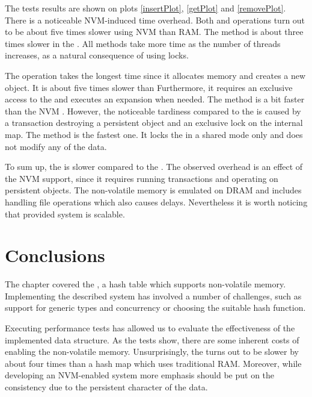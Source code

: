         The tests results are shown on plots \ref{insertPlot}, \ref{getPlot} and \ref{removePlot}. 
        There is a noticeable NVM-induced time overhead. 
        Both \insertMethod and \removeMethod operations turn out to be about five times slower using NVM than RAM. 
        The \getMethod method is about three times slower in the \NvmHashMap.
        All methods take more time as the number of threads increases, as a natural consequence of using locks.
        
        
        The \insertMethod operation takes the longest time since it allocates memory and creates a new object.
        It is about five times slower than
        Furthermore, it requires an exclusive access to the \internalHashMap and executes an expansion when needed. 
        The \removeMethod method is a bit faster than the NVM \insertMethod. 
        However, the noticeable tardiness compared to the \unorderedMap is caused by a transaction destroying a persistent object and an exclusive lock on the internal map.
        The \getMethod method is the fastest one. 
        It locks the \internalHashMap in a shared mode only and does not modify any of the data. 
        
        To sum up, the \NvmHashMap is slower compared to the \unorderedMap. 
        The observed overhead is an effect of the NVM support, since it requires running transactions and operating on persistent objects. 
        The non-volatile memory is emulated on DRAM and includes handling file operations which also causes delays.
        Nevertheless it is worth noticing that provided system is scalable.
        
\section{Conclusions}
    The chapter covered the \NvmHashMap, a hash table which supports non-volatile memory. Implementing the described system has involved a number of challenges, such as support for generic types and concurrency or choosing the suitable hash function. 
    
    Executing performance tests has allowed us to evaluate the effectiveness of the implemented data structure. 
    As the tests show, there are some inherent costs of enabling the non-volatile memory. 
    Unsurprisingly, the \NvmHashMap turns out to be slower by about four times than a hash map which uses traditional RAM. %
    Moreover, while developing an NVM-enabled system more emphasis should be put on the consistency due to the persistent character of the data.
